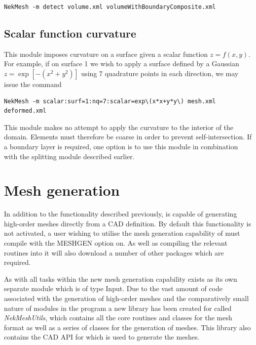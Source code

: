 \begin{lstlisting}[style=BashInputStyle]
  NekMesh -m detect volume.xml volumeWithBoundaryComposite.xml
\end{lstlisting}

\subsection{Scalar function curvature}

This module imposes curvature on a surface given a scalar function
$z=f(x,y)$. For example, if on surface 1 we wish to apply a surface defined by a
Gaussian $z = \exp[-(x^2+y^2)]$ using 7 quadrature points in each direction, we
may issue the command

\begin{lstlisting}[style=BashInputStyle]
  NekMesh -m scalar:surf=1:nq=7:scalar=exp\(x*x+y*y\) mesh.xml deformed.xml
\end{lstlisting}

\begin{notebox}
  This module makes no attempt to apply the curvature to the interior of the
  domain. Elements must therefore be coarse in order to prevent
  self-intersection. If a boundary layer is required, one option is to use this
  module in combination with the splitting module described earlier.
\end{notebox}



\section{Mesh generation}

In addition to the functionality described previously, \mc is capable of
generating high-order meshes directly from a CAD definition.
By default this functionality is not activated, a user wishing to utilise the
mesh generation capability of \mc must compile \nekpp with the MESHGEN option
on. As well as compiling the relevant routines into \mc it will also download
a number of other packages which are required.

As with all tasks within \mc the new mesh generation capability exists as its
own separate module which is of type Input. Due to the vast amount of code
associated with the generation of high-order meshes and the comparatively small
nature of modules in the \mc program a new library has been created for \nekpp
called {\em NekMeshUtils}, which contains all the core routines and classes for
the \mc mesh format as well as a series of classes for the generation of meshes.
This library also contains the CAD API for \nekpp which is used to generate the
meshes.

